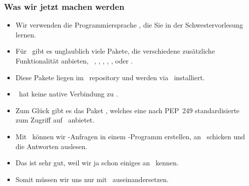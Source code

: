 \documentclass[aspectratio=169,mathserif,notheorems]{beamer}%
\begin{document}
\begin{frame}%
\frametitle{Was wir jetzt machen werden}%
\begin{itemize}%
%
%
\item<2-> Wir verwenden die Programmiersprache \python, die Sie in der Schwestervorlesung \cite{programmingWithPython} lernen.%
%
%
%
\item<7-> Für \python\ gibt es unglaublich viele Pakete, die verschiedene zusätzliche Funktionalität anbieten, \DEzB~\numpy, \pandas, \scikitlearn, \scipy, \tensorflow, oder \pytorch.%
%
\item<8-> Diese Pakete liegen im \pypi\ repository und werden via \pip\ installiert.%
%
\item<9-> \python\ hat keine native Verbindung zu \postgresql.%
%
\item<10-> Zum Glück gibt es das Paket \psycopg, welches eine nach PEP~249\cite{PEP249} standardisierte  zum Zugriff auf \postgresql\ anbietet.%
%
\item<11-> Mit \psycopg\ können wir \sql-Anfragen in einem \python-Programm erstellen, an \postgresql\ schicken und die Antworten auslesen.%
%
\item<12-> Das ist sehr gut, weil wir ja schon einiges an \sql\ kennen.%
%
\item<13-> Somit müssen wir uns nur mit \python\ auseinandersetzen.%
\end{itemize}%
\end{frame}%
%
%
\end{document}
